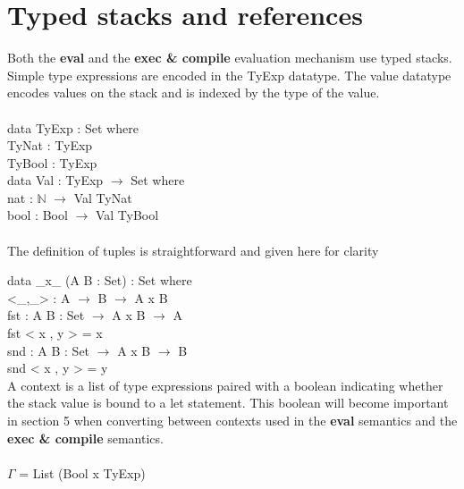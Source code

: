 \documentclass[paper=a4, fontsize=11pt]{scrartcl} %
\numberwithin{equation}{section} %
\numberwithin{figure}{section} %
\numberwithin{table}{section} %
\begin{document}
\section{Typed stacks and references}
Both the \textbf{eval} and the \textbf{exec \& compile} evaluation mechanism use typed stacks. Simple type expressions are encoded in the \ttfamily TyExp \normalfont datatype. The value datatype encodes values on the stack and is indexed by the type of the value. \\
\\
\ttfamily
data TyExp : Set where\\
\hspace*{5mm}TyNat : TyExp\\
\hspace*{5mm}TyBool : TyExp\\

data Val : TyExp $\rightarrow$ Set where\\
\hspace*{5mm}nat : $\mathbb{N}$ $\rightarrow$ Val TyNat\\
\hspace*{5mm}bool : Bool $\rightarrow$ Val TyBool\\
  \\
\normalfont
The definition of tuples is straightforward and given here for clarity \\
\ttfamily

data \_x\_ (A B : Set) : Set where\\
\hspace*{5mm}<\_,\_> : A $\rightarrow$ B $\rightarrow$ A x B\\

fst : {A B : Set} $\rightarrow$ A x B $\rightarrow$ A\\
fst < x , y > = x\\

snd : {A B : Set} $\rightarrow$ A x B $\rightarrow$ B\\
snd < x , y > = y\\

\normalfont
A context is a list of type expressions paired with a boolean indicating whether the stack value is bound to a \ttfamily let \normalfont statement. This boolean will become important in section 5 when converting between contexts used in the \textbf{eval} semantics and the \textbf{exec \& compile} semantics.  \\
\ttfamily
\\
$\Gamma$ = List (Bool x TyExp)\\
\end{document}
